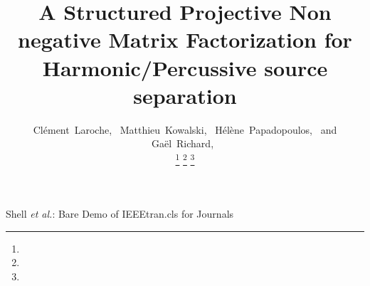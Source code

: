 \documentclass[journal]{IEEEtran}
\begin{document}
%
\title{A Structured Projective Non negative Matrix Factorization for Harmonic/Percussive source separation}
%
%
%

\author{Cl\'{e}ment~Laroche,~
        Matthieu~Kowalski,~
        H\'{e}l\`{e}ne~Papadopoulos,~
        and Ga\"{el}~Richard,~%
        
\thanks{}%
\thanks{}%
\thanks{}}

% 
%



\markboth{}%
{Shell \MakeLowercase{\textit{et al.}}: Bare Demo of IEEEtran.cls for Journals}
% 
\end{document}
